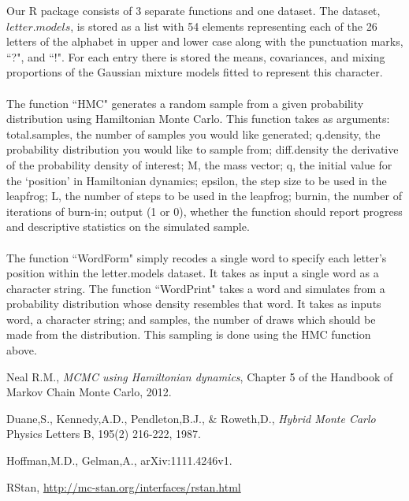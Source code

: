 \documentclass[11pt]{article}
\begin{document}
\noindent Our R package consists of 3 separate functions and one dataset.
The dataset, $letter.models$, is stored as a list with 54 elements representing each of the 26 letters of the alphabet in upper and lower case along with the punctuation marks, ``?", and ``!". For each entry there is stored the means, covariances, and mixing proportions of the Gaussian mixture models fitted to represent this character.
\\
\\
The function ``HMC" generates a random sample from a given probability distribution using Hamiltonian Monte Carlo. This function takes as arguments: total.samples, the number of samples you would like generated; q.density, the probability distribution you would like to sample from; diff.density the derivative of the probability density of interest; M, the mass vector; q, the initial value for the `position' in Hamiltonian dynamics; epsilon, the step size to be used in the leapfrog; L, the number of steps to be used in the leapfrog; burnin, the number of iterations of burn-in; output (1 or 0), whether the function should report progress and descriptive statistics on the simulated sample.
\\
\\
The function ``WordForm" simply recodes a single word to specify each letter's position within the letter.models dataset. It takes as input a single word as a character string.
The function ``WordPrint" takes a word and simulates from a probability distribution whose density resembles that word. It takes as inputs word, a character string; and samples, the number of draws which should be made from the distribution. This sampling is done using the HMC function above.
\pagebreak
\begin{thebibliography}{9}

  Neal R.M.,
  \emph{MCMC using Hamiltonian dynamics},
  Chapter 5 of the Handbook of Markov Chain Monte Carlo,
  2012.
  
  Duane,S., Kennedy,A.D., Pendleton,B.J., \& Roweth,D.,
  \emph{Hybrid Monte Carlo }
  Physics Letters B, 195(2) 216-222, 1987.

  Hoffman,M.D., Gelman,A.,
  arXiv:1111.4246v1.
  
  RStan, \url{http://mc-stan.org/interfaces/rstan.html}

\end{thebibliography}
\end{document}
